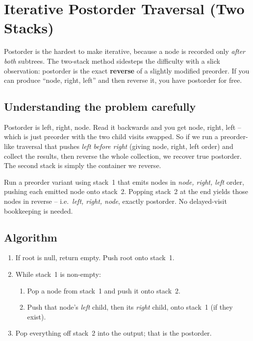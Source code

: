 \section{Iterative Postorder Traversal (Two Stacks)}
\label{sec:trees-iter-post-two}


\begin{patternbox}
Postorder is the hardest to make iterative, because a node is recorded
only \emph{after both} subtrees. The two-stack method sidesteps the
difficulty with a slick observation: postorder is the exact
\textbf{reverse} of a slightly modified preorder. If you can produce
``node, right, left'' and then reverse it, you have postorder for free.
\end{patternbox}

\subsection*{Understanding the problem carefully}

Postorder is left, right, node. Read it backwards and you get node, right,
left -- which is just preorder with the two child visits swapped. So if we
run a preorder-like traversal that pushes \emph{left before right} (giving
node, right, left order) and collect the results, then reverse the whole
collection, we recover true postorder. The second stack is simply the
container we reverse.

\begin{ideabox}[Postorder = reverse of (node, right, left)]
Run a preorder variant using stack~1 that emits nodes in \emph{node,
right, left} order, pushing each emitted node onto stack~2. Popping
stack~2 at the end yields those nodes in reverse -- i.e.\ \emph{left,
right, node}, exactly postorder. No delayed-visit bookkeeping is needed.
\end{ideabox}

\subsection*{Algorithm}

\begin{enumerate}
  \item If root is null, return empty. Push root onto stack~1.
  \item While stack~1 is non-empty:
  \begin{enumerate}
    \item Pop a node from stack~1 and push it onto stack~2.
    \item Push that node's \emph{left} child, then its \emph{right}
          child, onto stack~1 (if they exist).
  \end{enumerate}
  \item Pop everything off stack~2 into the output; that is the
        postorder.
\end{enumerate}

